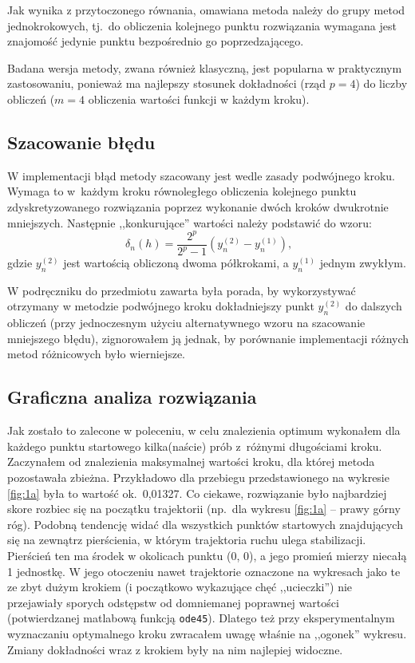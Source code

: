 \documentclass[12pt]{article}
\begin{document}
Jak wynika z przytoczonego równania, omawiana metoda należy do grupy metod jednokrokowych, tj.~do obliczenia kolejnego punktu rozwiązania wymagana jest znajomość jedynie punktu bezpośrednio go poprzedzającego.

Badana wersja metody, zwana również klasyczną, jest popularna w praktycznym zastosowaniu, ponieważ ma najlepszy stosunek dokładności (rząd \( p=4 \)) do liczby obliczeń (\( m=4 \) obliczenia wartości funkcji w każdym kroku).

\subsection{Szacowanie błędu}

W implementacji błąd metody szacowany jest wedle zasady podwójnego kroku. Wymaga to w~każdym kroku równoległego obliczenia kolejnego punktu zdyskretyzowanego rozwiązania poprzez wykonanie dwóch kroków dwukrotnie mniejszych. Następnie ,,konkurujące'' wartości należy podstawić do wzoru:
\[ \delta_n(h) = \frac{2^p}{2^p - 1} (y_n^{(2)} - y_n^{(1)}) \text{,}\]
gdzie \( y_n^{(2)} \) jest wartością obliczoną dwoma półkrokami, a \( y_n^{(1)} \) jednym zwykłym.

W podręczniku do przedmiotu zawarta była porada, by wykorzystywać otrzymany w metodzie podwójnego kroku dokładniejszy punkt \( y_n^{(2)} \) do dalszych obliczeń (przy jednoczesnym użyciu alternatywnego wzoru na szacowanie mniejszego błędu), zignorowałem ją jednak, by porównanie implementacji różnych metod różnicowych było wierniejsze.

\subsection{Graficzna analiza rozwiązania}
Jak zostało to zalecone w poleceniu, w celu znalezienia optimum wykonałem dla każdego punktu startowego kilka(naście) prób z~różnymi długościami kroku. Zaczynałem od znalezienia maksymalnej wartości kroku, dla której metoda pozostawała zbieżna. Przykładowo dla przebiegu przedstawionego na wykresie \ref{fig:1a} była to wartość ok.~0,01327. Co ciekawe, rozwiązanie było najbardziej skore rozbiec się na początku trajektorii (np.~dla wykresu \ref{fig:1a} -- prawy górny róg). Podobną tendencję widać dla wszystkich punktów startowych znajdujących się na zewnątrz pierścienia, w którym trajektoria ruchu ulega stabilizacji. Pierścień ten ma środek w okolicach punktu (0, 0), a jego promień mierzy niecałą 1 jednostkę. W jego otoczeniu nawet trajektorie oznaczone na wykresach jako te ze zbyt dużym krokiem (i początkowo wykazujące chęć ,,ucieczki'') nie przejawiały sporych odstępstw od domniemanej poprawnej wartości (potwierdzanej matlabową funkcją \texttt{ode45}). Dlatego też przy eksperymentalnym wyznaczaniu optymalnego kroku zwracałem uwagę właśnie na ,,ogonek'' wykresu. Zmiany dokładności wraz z krokiem były na nim najlepiej widoczne.
\end{document}
